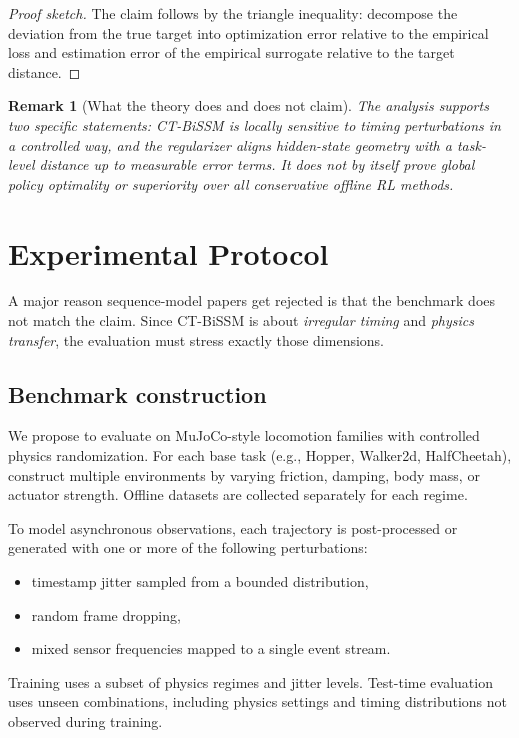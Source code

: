 \documentclass[11pt]{article}
\newtheorem{remark}[theorem]{Remark}
\begin{document}
\begin{proof}[Proof sketch]
The claim follows by the triangle inequality: decompose the deviation from the true target into optimization error relative to the empirical loss and estimation error of the empirical surrogate relative to the target distance.
\end{proof}

\begin{remark}[What the theory does and does not claim]
The analysis supports two specific statements: CT-BiSSM is locally sensitive to timing perturbations in a controlled way, and the regularizer aligns hidden-state geometry with a task-level distance up to measurable error terms. It does \emph{not} by itself prove global policy optimality or superiority over all conservative offline RL methods.
\end{remark}

\section{Experimental Protocol}

A major reason sequence-model papers get rejected is that the benchmark does not match the claim. Since CT-BiSSM is about \emph{irregular timing} and \emph{physics transfer}, the evaluation must stress exactly those dimensions.

\subsection{Benchmark construction}

We propose to evaluate on MuJoCo-style locomotion families with controlled physics randomization. For each base task (e.g., Hopper, Walker2d, HalfCheetah), construct multiple environments by varying friction, damping, body mass, or actuator strength. Offline datasets are collected separately for each regime.

To model asynchronous observations, each trajectory is post-processed or generated with one or more of the following perturbations:
\begin{itemize}
    \item timestamp jitter sampled from a bounded distribution,
    \item random frame dropping,
    \item mixed sensor frequencies mapped to a single event stream.
\end{itemize}

Training uses a subset of physics regimes and jitter levels. Test-time evaluation uses unseen combinations, including physics settings and timing distributions not observed during training.
\end{document}
